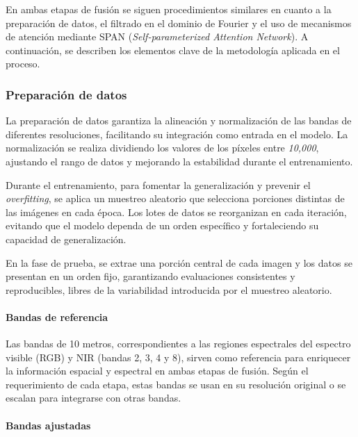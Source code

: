         En ambas etapas de fusión se siguen procedimientos similares en cuanto a la preparación de datos, el filtrado en el dominio de Fourier y el uso de mecanismos de atención mediante SPAN (\textit{Self-parameterized Attention Network}). A continuación, se describen los elementos clave de la metodología aplicada en el proceso.


        \subsubsection{Preparación de datos}

            La preparación de datos garantiza la alineación y normalización de las bandas de diferentes resoluciones, facilitando su integración como entrada en el modelo. La normalización se realiza dividiendo los valores de los píxeles entre \textit{10,000}, ajustando el rango de datos y mejorando la estabilidad durante el entrenamiento.

            Durante el entrenamiento, para fomentar la generalización y prevenir el \textit{overfitting}, se aplica un muestreo aleatorio que selecciona porciones distintas de las imágenes en cada época. Los lotes de datos se reorganizan en cada iteración, evitando que el modelo dependa de un orden específico y fortaleciendo su capacidad de generalización.
            
            En la fase de prueba, se extrae una porción central de cada imagen y los datos se presentan en un orden fijo, garantizando evaluaciones consistentes y reproducibles, libres de la variabilidad introducida por el muestreo aleatorio.

            \paragraph{Bandas de referencia}

                Las bandas de 10 metros, correspondientes a las regiones espectrales del espectro visible (RGB) y NIR (bandas 2, 3, 4 y 8), sirven como referencia para enriquecer la información espacial y espectral en ambas etapas de fusión. Según el requerimiento de cada etapa, estas bandas se usan en su resolución original o se escalan para integrarse con otras bandas.


            \paragraph{Bandas ajustadas}


